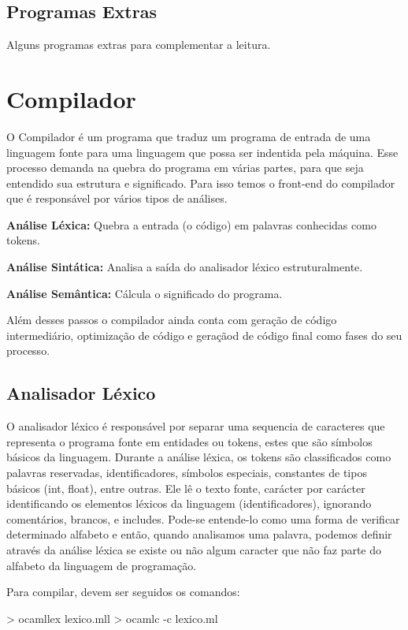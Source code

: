 \documentclass[12pt,a4paper,twoside]{report}
\begin{document}
\section{Programas Extras}
Alguns programas extras para complementar a leitura.

%


\chapter{Compilador}
O Compilador é um programa que traduz um programa de entrada de uma linguagem fonte para uma linguagem que possa ser indentida pela máquina. Esse processo demanda na quebra do programa em várias partes, para que seja entendido sua estrutura e significado. Para isso temos o front-end do compilador que é responsável por vários tipos de análises.

\textbf{Análise Léxica:}
Quebra a entrada (o código) em palavras conhecidas como tokens.

\textbf{Análise Sintática:}
Analisa a saída do analisador léxico estruturalmente.

\textbf{Análise Semântica:}
Cálcula o significado do programa.

Além desses passos o compilador ainda conta com geração de código intermediário, optimização de código e geraçãod de código final como fases do seu processo.

\section{Analisador Léxico}
O analisador léxico é responsável por separar uma sequencia de caracteres que representa o programa fonte em entidades ou tokens, estes que são símbolos básicos da linguagem. Durante a análise léxica, os tokens são classificados como palavras reservadas, identificadores, símbolos especiais, constantes de tipos básicos (int, float), entre outras. Ele lê o texto fonte, carácter por carácter identificando os elementos léxicos da linguagem (identificadores), ignorando comentários, brancos, e includes. Pode-se entende-lo  como uma forma de verificar determinado alfabeto e então, quando analisamos uma palavra, podemos definir através da análise léxica se existe ou não algum caracter que não faz parte do alfabeto da linguagem de programação.


Para compilar, devem ser seguidos os comandos:
\begin{terminal}
> ocamllex lexico.mll
> ocamlc -c lexico.ml
\end{terminal}
\end{document}
